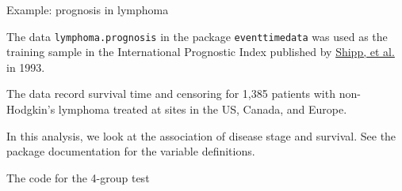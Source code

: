 \documentclass[ignorenonframetext,]{beamer}
\newenvironment{Shaded}{\begin{snugshade}}{\end{snugshade}}
\newcommand{\CommentTok}[1]{\textcolor[rgb]{0.56,0.35,0.01}{\textit{#1}}}
\newcommand{\DecValTok}[1]{\textcolor[rgb]{0.00,0.00,0.81}{#1}}
\newcommand{\KeywordTok}[1]{\textcolor[rgb]{0.13,0.29,0.53}{\textbf{#1}}}
\newcommand{\NormalTok}[1]{#1}
\newcommand{\OperatorTok}[1]{\textcolor[rgb]{0.81,0.36,0.00}{\textbf{#1}}}
\newcommand{\StringTok}[1]{\textcolor[rgb]{0.31,0.60,0.02}{#1}}
\begin{document}
\begin{frame}{%
\protect\hypertarget{example-prognosis-in-lymphoma}{%
Example: prognosis in lymphoma}}

The data \texttt{lymphoma.prognosis} in the package
\texttt{eventtimedata} was used as the training sample in the
International Prognostic Index published by
\href{../../clinical_papers/shipp_int_prog_index_nejm.pdf}{Shipp, et
al.} in 1993.

The data record survival time and censoring for 1,385 patients with
non-Hodgkin’s lymphoma treated at sites in the US, Canada, and Europe.

In this analysis, we look at the association of disease stage and
survival. See the package documentation for the variable definitions.

\end{frame}

\begin{frame}[fragile]{%
\protect\hypertarget{the-code-for-the-4-group-test}{%
The code for the 4-group test}}

\footnotesize

\begin{Shaded}
\end{Shaded}

\end{frame}
\end{document}
